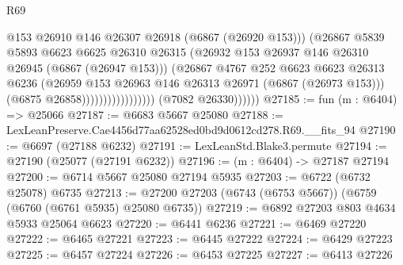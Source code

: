 \begin{lexlean}{R69}
\begin{coremodule}
{                                            @153
                                            @26910
                                            @146
                                            @26307
                                            @26918
                                            (@6867 (@26920 @153)))
                                          (@26867
                                            @5839
                                            @5893
                                            @6623
                                            @6625
                                            @26310
                                            @26315
                                            (@26932
                                              @153
                                              @26937
                                              @146
                                              @26310
                                              @26945
                                              (@6867 (@26947 @153)))
                                            (@26867
                                              @4767
                                              @252
                                              @6623
                                              @6623
                                              @26313
                                              @6236
                                              (@26959
                                                @153
                                                @26963
                                                @146
                                                @26313
                                                @26971
                                                (@6867 (@26973 @153)))
                                              (@6875 @26858)))))))))))))))))
              (@7082 @26330))))))
@27185 := fun (m : @6404) => @25066
@27187 := @6683 @5667 @25080
@27188 := LexLeanPreserve.Cae4456d77aa62528ed0bd9d0612cd278.R69.__fits_94
@27190 := @6697 (@27188 @6232)
@27191 := LexLeanStd.Blake3.permute
@27194 := @27190 (@25077 (@27191 @6232))
@27196 := (m : @6404) -> @27187 @27194
@27200 := @6714 @5667 @25080 @27194 @5935
@27203 := @6722 (@6732 @25078) @6735
@27213 := @27200 @27203 (@6743 (@6753 @5667)) (@6759 (@6760 (@6761 @5935) @25080 @6735))
@27219 := @6892 @27203 @803 @4634 @5933 @25064 @6623
@27220 := @6441 @6236
@27221 := @6469 @27220
@27222 := @6465 @27221
@27223 := @6445 @27222
@27224 := @6429 @27223
@27225 := @6457 @27224
@27226 := @6453 @27225
@27227 := @6413 @27226
}
\end{coremodule}
\end{lexlean}
